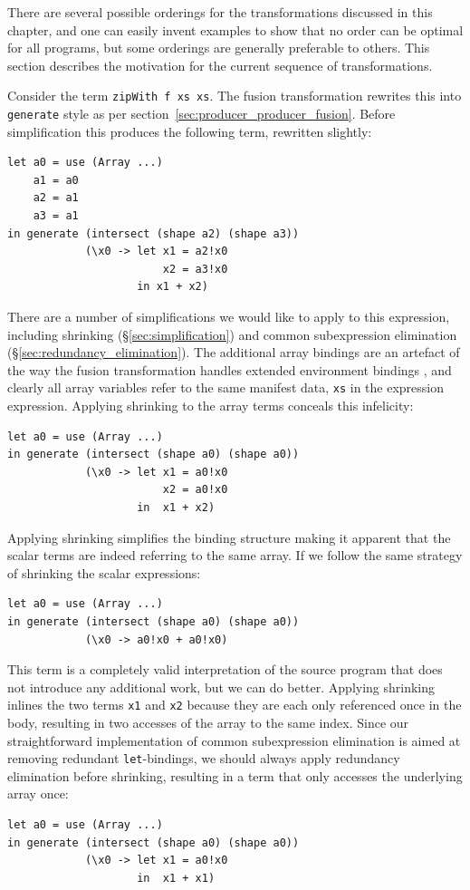 
There are several possible orderings for the transformations discussed in this
chapter, and one can easily invent examples to show that no order can be optimal
for all programs, but some orderings are generally preferable to others. This
section describes the motivation for the current sequence of transformations.

Consider the term \lstinline[style=inline]{zipWith f xs xs}. The fusion
transformation rewrites this into \texttt{generate} style as per
section~\ref{sec:producer_producer_fusion}. Before simplification this produces
the following term, rewritten slightly: 
%
\begin{lstlisting}[style=haskell]
let a0 = use (Array ...)
    a1 = a0
    a2 = a1
    a3 = a1
in generate (intersect (shape a2) (shape a3))
            (\x0 -> let x1 = a2!x0
                        x2 = a3!x0
                    in x1 + x2)
\end{lstlisting}
%
There are a number of simplifications we would like to apply to this expression,
including shrinking (\S\ref{sec:simplification}) and common subexpression
elimination (\S\ref{sec:redundancy_elimination}). The additional array bindings
are an artefact of the way the fusion transformation handles extended
environment bindings ,
and clearly all array variables refer to the same manifest data, \texttt{xs} in
the expression expression. Applying shrinking to the array terms conceals this
infelicity:
%
\begin{lstlisting}[style=haskell]
let a0 = use (Array ...)
in generate (intersect (shape a0) (shape a0))
            (\x0 -> let x1 = a0!x0
                        x2 = a0!x0
                    in  x1 + x2)
\end{lstlisting}
%
Applying shrinking simplifies the binding structure making it apparent that the
scalar terms are indeed referring to the same array. If we follow the same
strategy of shrinking the scalar expressions:
%
\begin{lstlisting}[style=haskell]
let a0 = use (Array ...)
in generate (intersect (shape a0) (shape a0))
            (\x0 -> a0!x0 + a0!x0)
\end{lstlisting}
%
This term is a completely valid interpretation of the source program that does
not introduce any additional work, but we can do better. Applying shrinking
inlines the two terms \texttt{x1} and \texttt{x2} because they are each only
referenced once in the body, resulting in two accesses of the array to the same
index. Since our straightforward implementation of common subexpression
elimination is aimed at removing redundant \texttt{let}-bindings, we should
always apply redundancy elimination before shrinking, resulting in a term that
only accesses the underlying array once:
%
\begin{lstlisting}[style=haskell]
let a0 = use (Array ...)
in generate (intersect (shape a0) (shape a0))
            (\x0 -> let x1 = a0!x0
                    in  x1 + x1)
\end{lstlisting}

